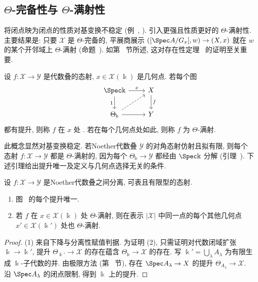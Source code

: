 \subsection{\texorpdfstring{$\Theta$}{Θ}-完备性与 \texorpdfstring{$\Theta$}{Θ}-满射性}\label{src:7.10.3-subsection}
将闭点映为闭点的性质对基变换不稳定 (例~, ). 引入更强且性质更好的 $\Theta$-满射性. 主要结果是: 只要 $\mathcal X$ 是 $\Theta$-完备的, 平展商展示 $([\Spec A/G_x],w)\to(\mathcal X,x)$ 就在 $w$ 的某个开邻域上 $\Theta$-满射 (命题~). 如第~ 节所述, 这对存在性定理~ 的证明至关重要.
\begin{definition}\label{src:7.10.8}
设 $f:\mathcal X\to\mathcal Y$ 是代数叠的态射, $x\in\mathcal X(\Bbbk)$ 是几何点. 若每个图
\begin{align}\label{src:7.10.9}
\begin{tikzcd}[ampersand replacement=\&]\Spec\Bbbk\arrow[r,"{x}"]\arrow[d,"{1}"']\&\mathcal X\arrow[d,"{f}"]\\\Theta_{\Bbbk}\arrow[r]\arrow[ur,dashed]\&\mathcal Y\end{tikzcd}
\end{align}
都有提升, 则称 $f$ 在 $x$ 处 . 若在每个几何点处如此, 则称 $f$ 为 $\Theta$-满射.
\end{definition}
此概念显然对基变换稳定. 若Noether代数叠 $\mathcal Y$ 的对角态射仿射且拟有限, 则每个态射 $f:\mathcal X\to\mathcal Y$ 都是 $\Theta$-满射的, 因为每个 $\Theta_{\Bbbk}\to\mathcal Y$ 都经由 $\Spec\Bbbk$ 分解 (引理~). 下述引理给出提升唯一及定义与几何点选择无关的条件.
\begin{lemma}\label{src:7.10.10}
设 $f:\mathcal X\to\mathcal Y$ 是Noether代数叠之间分离, 可表且有限型的态射.
\begin{enumerate}[(1)]
\item 图~ 的每个提升唯一.
\item 若 $f$ 在 $x\in\mathcal X(\Bbbk)$ 处 $\Theta$-满射, 则在表示 $|\mathcal X|$ 中同一点的每个其他几何点 $x'\in\mathcal X(\Bbbk')$ 处也 $\Theta$-满射.
\end{enumerate}
\end{lemma}
\begin{proof}
(1) 来自下降与分离性赋值判据. 为证明 (2), 只需证明对代数闭域扩张 $\Bbbk\to\Bbbk'$, 提升 $\Theta_{\Bbbk'}\to\mathcal X$ 的存在蕴含 $\Theta_{\Bbbk}\to\mathcal X$ 的存在. 写 $\Bbbk'=\bigcup_\lambda A_\lambda$ 为有限生成 $\Bbbk$-子代数的并. 由极限方法 (第~ 节), 存在 $\Spec A_\lambda\to\mathcal X$ 的提升 $\Theta_{A_\lambda}\to\mathcal X$. 沿 $\Spec A_\lambda$ 的闭点限制, 得到 $\Bbbk$ 上的提升.
\end{proof}
